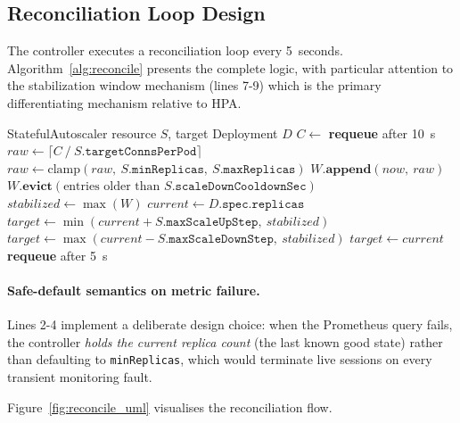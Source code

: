 \documentclass[3p,twocolumn]{elsarticle}
\theoremstyle{plain}%
\theoremstyle{definition}%
\begin{document}
\subsection{Reconciliation Loop Design}

The controller executes a reconciliation loop every 5~seconds. Algorithm~\ref{alg:reconcile}
presents the complete logic, with particular attention to the stabilization window mechanism
(lines 7-9) which is the primary differentiating mechanism relative to HPA.

\begin{algorithm}[ht]
\caption{\texttt{StatefulAutoscaler} Reconciliation Logic}
\label{alg:reconcile}
\begin{algorithmic}[1]
\Require StatefulAutoscaler resource $S$, target Deployment $D$
\State $C \gets$ 
    \State \textbf{requeue} after 10~s 
    \State \Return
\EndIf
\State $raw \gets \lceil C\ /\ S.\texttt{targetConnsPerPod} \rceil$
\State $raw \gets \text{clamp}(raw,\ S.\texttt{minReplicas},\ S.\texttt{maxReplicas})$
\State $W.\textbf{append}(now,\ raw)$ 
\State $W.\textbf{evict}(\text{entries older than } S.\texttt{scaleDownCooldownSec})$
\State $stabilized \gets \max(W)$ 
\State $current \gets D.\texttt{spec.replicas}$
    \State $target \gets \min(current + S.\texttt{maxScaleUpStep},\ stabilized)$
    \State $target \gets \max(current - S.\texttt{maxScaleDownStep},\ stabilized)$
\Else
    \State $target \gets current$
\EndIf
\State {}
\State \textbf{requeue} after 5~s
\end{algorithmic}
\end{algorithm}

\paragraph{Safe-default semantics on metric failure.}
Lines 2-4 implement a deliberate design choice: when the Prometheus query fails, the controller \textit{holds the current replica count} (the last known good state) rather than defaulting to \texttt{minReplicas}, which would terminate live sessions on every transient monitoring fault.

Figure~\ref{fig:reconcile_uml} visualises the reconciliation flow.
\end{document}
